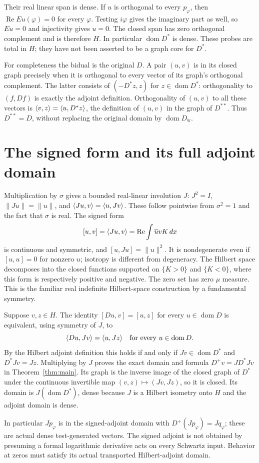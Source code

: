 \documentclass[11pt]{article}
\newcommand{\dom}{\operatorname{dom}}\newcommand{\ran}{\operatorname{ran}}
\begin{document}
Their real linear span is dense. If $u$ is orthogonal to every
$p_\varphi$, then $\operatorname{Re}Eu(\varphi)=0$ for every
$\varphi$. Testing $i\varphi$ gives the imaginary part as well,
so $Eu=0$ and injectivity gives $u=0$. The closed span has zero
orthogonal complement and is therefore $H$. In particular
$\dom D^*$ is dense. These probes are total in $H$; they have
not been asserted to be a graph core for $D^*$.

For completeness the bidual is the original $D$. A pair $(u,v)$
is in its closed graph precisely when it is orthogonal to every
vector of its graph's orthogonal complement. The latter consists
of $(-D^*z,z)$ for $z\in\dom D^*$: orthogonality to $(f,Df)$
is exactly the adjoint definition. Orthogonality of $(u,v)$ to
all these vectors is $\langle v,z\rangle=\langle u,D^*z\rangle$, the definition of
$(u,v)$ in the graph of $D^{**}$. Thus $D^{**}=D$, without
replacing the original domain by $\dom D_{\mathrm w}$.

\section{The signed form and its full adjoint domain}
Multiplication by $\sigma$ gives a bounded real-linear involution
$J$: $J^2=I$, $\|Ju\|=\|u\|$, and
$\langle Ju,v\rangle=\langle u,Jv\rangle$. These follow pointwise from
$\sigma^2=1$ and the fact that $\sigma$ is real. The signed form
\[
 [u,v]=\langle Ju,v\rangle=\operatorname{Re}\int\overline u vK\,dx
\]
is continuous and symmetric, and $[u,Ju]=\|u\|^2$. It is
nondegenerate even if $[u,u]=0$ for nonzero $u$; isotropy is
different from degeneracy. The Hilbert space decomposes into
the closed functions supported on $\{K>0\}$ and $\{K<0\}$,
where this form is respectively positive and negative. The zero
set has zero $\mu$ measure. This is the familiar real indefinite
Hilbert-space construction by a fundamental symmetry.

Suppose $v,z\in H$. The identity $[Du,v]=[u,z]$ for every
$u\in\dom D$ is equivalent, using symmetry of $J$, to
\[
 \ip{Du}{Jv}=\ip u{Jz}\quad\hbox{for every }u\in\dom D.
\]
By the Hilbert adjoint definition this holds if and only if
$Jv\in\dom D^*$ and $D^*Jv=Jz$. Multiplying by $J$ proves
the exact domain and formula $D^+v=JD^*Jv$ in
Theorem~\ref{thm:main}. Its graph is the inverse image of the
closed graph of $D^*$ under the continuous invertible map
$(v,z)\mapsto(Jv,Jz)$, so it is closed. Its domain is
$J(\dom D^*)$, dense because $J$ is a Hilbert isometry onto
$H$ and the adjoint domain is dense.

In particular $Jp_\varphi$ is in the signed-adjoint domain with
$D^+(Jp_\varphi)=Jq_\varphi$; these are actual dense test-generated
vectors. The signed adjoint is not obtained by presuming a formal
logarithmic derivative acts on every Schwartz input. Behavior at
zeros must satisfy its actual transported Hilbert-adjoint domain.
\end{document}
